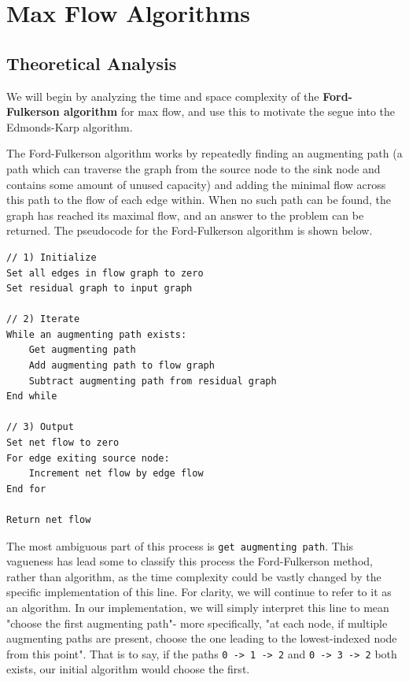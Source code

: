 \documentclass[12pt]{amsart}
\begin{document}
\section{Max Flow Algorithms}

\subsection{Theoretical Analysis}

    We will begin by analyzing the time and space complexity
    of the \textbf{Ford-Fulkerson algorithm} for max flow, and
    use this to motivate the segue into the Edmonds-Karp
    algorithm.

    The Ford-Fulkerson algorithm works by repeatedly finding an
    augmenting path (a path which can traverse the graph from
    the source node to the sink node and contains some amount of
    unused capacity) and adding the minimal flow across this
    path to the flow of each edge within. When no such path can
    be found, the graph has reached its maximal flow, and an
    answer to the problem can be returned. The pseudocode for
    the Ford-Fulkerson algorithm is shown below.

\begin{verbatim}
// 1) Initialize
Set all edges in flow graph to zero
Set residual graph to input graph

// 2) Iterate
While an augmenting path exists:
    Get augmenting path
    Add augmenting path to flow graph
    Subtract augmenting path from residual graph
End while

// 3) Output
Set net flow to zero
For edge exiting source node:
    Increment net flow by edge flow
End for

Return net flow
\end{verbatim}

    The most ambiguous part of this process is
    \verb|get augmenting path|. This vagueness has lead some to
    classify this process the Ford-Fulkerson method, rather than
    algorithm, as the time complexity could be vastly changed by
    the specific implementation of this line. For clarity, we
    will continue to refer to it as an algorithm. In our
    implementation, we will simply interpret this line to mean
    "choose the first augmenting path"- more specifically, 
    "at each node, if multiple augmenting paths are present,
    choose the one leading to the lowest-indexed node from this
    point". That is to say, if the paths \verb|0 -> 1 -> 2| and
    \verb|0 -> 3 -> 2| both exists, our initial algorithm would
    choose the first.
\end{document}
